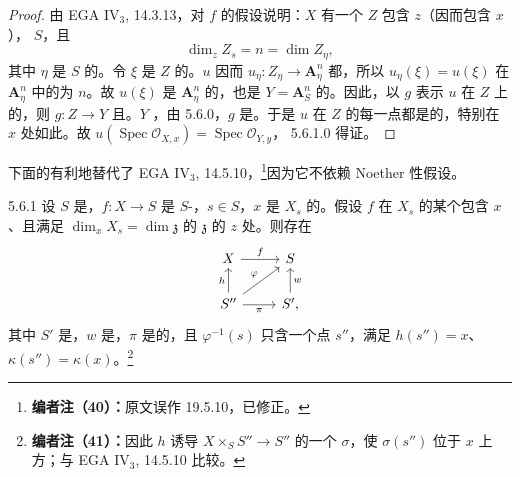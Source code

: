 \begin{proof}
由 EGA IV$_3$, 14.3.13，对 $f$ 的假设说明：$X$ 有一个 $Z$ 包含 $z$（因而包含 $x$）， $S$，且
\[
\dim_z Z_s=n=\dim Z_\eta,
\]
其中 $\eta$ 是 $S$ 的。令 $\xi$ 是 $Z$ 的。$u$ 因而 $u_\eta:Z_\eta\to\mathbf A_\eta^n$ 都，所以 $u_\eta(\xi)=u(\xi)$ 在 $\mathbf A_\eta^n$ 中的为 $n$。故 $u(\xi)$ 是 $\mathbf A_\eta^n$ 的，也是 $Y=\mathbf A_S^n$ 的。因此，以 $g$ 表示 $u$ 在 $Z$ 上的，则 $g:Z\to Y$ 且。$Y$ ，由 5.6.0，$g$ 是。于是 $u$ 在 $Z$ 的每一点都是的，特别在 $x$ 处如此。故 $u(\operatorname{Spec}\mathcal O_{X,x})=\operatorname{Spec}\mathcal O_{Y,y}$， 5.6.1.0 得证。
\end{proof}
下面的有利地替代了 EGA IV$_3$, 14.5.10，\footnote{\textbf{编者注（40）：}原文误作 19.5.10，已修正。}因为它不依赖 Noether 性假设。
\begin{SGAresult}{}{5.6.1}
设 $S$ 是，$f:X\to S$ 是 $S$-，$s\in S$，$x$ 是 $X_s$ 的。假设 $f$ 在 $X_s$ 的某个包含 $x$、且满足 $\dim_xX_s=\dim\mathfrak z$ 的 $\mathfrak z$ 的 $z$ 处。则存在
\[
\begin{tikzcd}
X\arrow[r,"f"]&S\\
S''\arrow[u,"h"]\arrow[ur,"\varphi"]\arrow[r,"\pi"']&S'\arrow[u,"w"'],
\end{tikzcd}
\]
其中 $S'$ 是，$w$ 是，$\pi$ 是的，且 $\varphi^{-1}(s)$ 只含一个点 $s''$，满足 $h(s'')=x$、$\kappa(s'')=\kappa(x)$。\footnote{\textbf{编者注（41）：}因此 $h$ 诱导 $X\times_SS''\to S''$ 的一个 $\sigma$，使 $\sigma(s'')$ 位于 $x$ 上方；与 EGA IV$_3$, 14.5.10 比较。}
\end{SGAresult}
